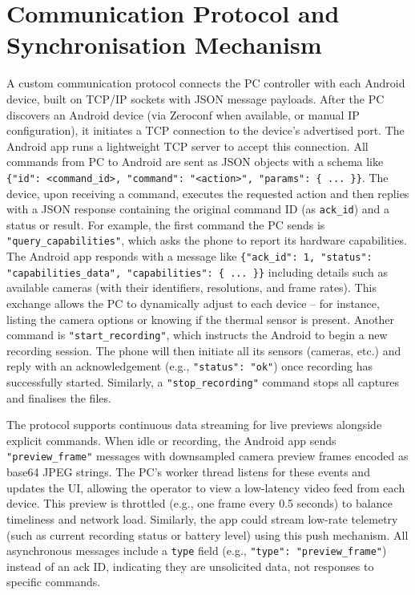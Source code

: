 \section{Communication Protocol and Synchronisation Mechanism}\label{sec:4-4}
A custom communication protocol connects the PC controller with each Android device, built on TCP/IP sockets \cite{ref21} with JSON message payloads. After the PC discovers an Android device (via Zeroconf when available, or manual IP configuration), it initiates a TCP connection to the device's advertised port. The Android app runs a lightweight TCP server to accept this connection. All commands from PC to Android are sent as JSON objects with a schema like \texttt{\{"id": <command\_id>, "command": "<action>", "params": \{ ... \}\}}. The device, upon receiving a command, executes the requested action and then replies with a JSON response containing the original command ID (as \texttt{ack\_id}) and a status or result. For example, the first command the PC sends is \texttt{"query\_capabilities"}, which asks the phone to report its hardware capabilities. The Android app responds with a message like \texttt{\{"ack\_id": 1, "status": "capabilities\_data", "capabilities": \{ ... \}\}} including details such as available cameras (with their identifiers, resolutions, and frame rates). This exchange allows the PC to dynamically adjust to each device -- for instance, listing the camera options or knowing if the thermal sensor is present. Another command is \texttt{"start\_recording"}, which instructs the Android to begin a new recording session. The phone will then initiate all its sensors (cameras, etc.) and reply with an acknowledgement (e.g., \texttt{"status": "ok"}) once recording has successfully started. Similarly, a \texttt{"stop\_recording"} command stops all captures and finalises the files.

The protocol supports continuous data streaming for live previews alongside explicit commands. When idle or recording, the Android app sends \texttt{"preview\_frame"} messages with downsampled camera preview frames encoded as base64 JPEG strings. The PC's worker thread listens for these events and updates the UI, allowing the operator to view a low-latency video feed from each device. This preview is throttled (e.g., one frame every 0.5 seconds) to balance timeliness and network load. Similarly, the app could stream low-rate telemetry (such as current recording status or battery level) using this push mechanism. All asynchronous messages include a \texttt{type} field (e.g., \texttt{"type": "preview\_frame"}) instead of an ack ID, indicating they are unsolicited data, not responses to specific commands.

